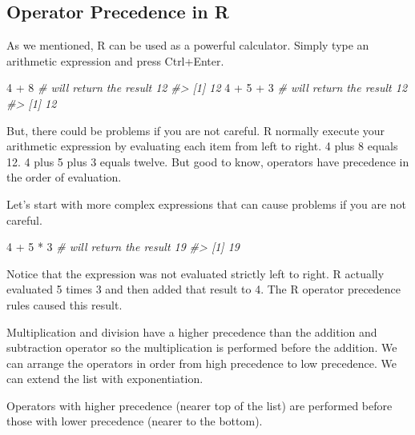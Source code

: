 \documentclass[
]{book}
\newenvironment{Shaded}{\begin{snugshade}}{\end{snugshade}}
\newcommand{\CommentTok}[1]{\textcolor[rgb]{0.56,0.35,0.01}{\textit{#1}}}
\newcommand{\DecValTok}[1]{\textcolor[rgb]{0.00,0.00,0.81}{#1}}
\newcommand{\SpecialCharTok}[1]{\textcolor[rgb]{0.00,0.00,0.00}{#1}}
\begin{document}
\hypertarget{operator-precedence-in-r}{%
\subsection{Operator Precedence in R}\label{operator-precedence-in-r}}

As we mentioned, R can be used as a powerful calculator. Simply type an arithmetic expression and press Ctrl+Enter.

\begin{Shaded}
\begin{Highlighting}[]
\DecValTok{4} \SpecialCharTok{+} \DecValTok{8}       \CommentTok{\# will return the result 12}
\CommentTok{\#\textgreater{} [1] 12}
\DecValTok{4} \SpecialCharTok{+} \DecValTok{5} \SpecialCharTok{+} \DecValTok{3}   \CommentTok{\# will return the result 12}
\CommentTok{\#\textgreater{} [1] 12}
\end{Highlighting}
\end{Shaded}

But, there could be problems if you are not careful. R normally execute your arithmetic expression by evaluating each item from left to right. 4 plus 8 equals 12. 4 plus 5 plus 3 equals twelve. But good to know, operators have precedence in the order of evaluation.

Let's start with more complex expressions that can cause problems if you are not careful.

\begin{Shaded}
\begin{Highlighting}[]
\DecValTok{4} \SpecialCharTok{+} \DecValTok{5} \SpecialCharTok{*} \DecValTok{3}    \CommentTok{\# will return the result 19}
\CommentTok{\#\textgreater{} [1] 19}
\end{Highlighting}
\end{Shaded}

Notice that the expression was not evaluated strictly left to right. R actually evaluated 5 times 3 and then added that result to 4. The R operator precedence rules caused this result.

Multiplication and division have a higher precedence than the addition and subtraction operator so the multiplication is performed before the addition. We can arrange the operators in order from high precedence to low precedence. We can extend the list with exponentiation.

Operators with higher precedence (nearer top of the list) are performed before those with lower precedence (nearer to the bottom).
\end{document}
